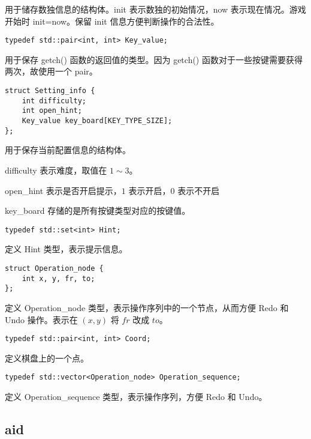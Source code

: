 \documentclass{article}
\begin{document}
    用于储存数独信息的结构体。init 表示数独的初始情况，now 表示现在情况。游戏开始时 init=now。保留 init 信息方便判断操作的合法性。

    \begin{lstlisting}
typedef std::pair<int, int> Key_value;
    \end{lstlisting}

    用于保存 getch() 函数的返回值的类型。因为 getch() 函数对于一些按键需要获得两次，故使用一个 pair。

    \begin{lstlisting}
struct Setting_info {
    int difficulty;
    int open_hint;
    Key_value key_board[KEY_TYPE_SIZE];
};
    \end{lstlisting}

    用于保存当前配置信息的结构体。
    
    difficulty 表示难度，取值在 $1\sim 3$。

    open\_hint 表示是否开启提示，$1$ 表示开启，$0$ 表示不开启

    key\_board 存储的是所有按键类型对应的按键值。

    \begin{lstlisting}
typedef std::set<int> Hint;
    \end{lstlisting}

    定义 Hint 类型，表示提示信息。

    \begin{lstlisting}
struct Operation_node {
    int x, y, fr, to;
};
    \end{lstlisting}

    定义 Operation\_node 类型，表示操作序列中的一个节点，从而方便 Redo 和 Undo 操作。表示在 $(x, y)$ 将 $fr$ 改成 $to$。

    \begin{lstlisting}
typedef std::pair<int, int> Coord;
    \end{lstlisting}

    定义棋盘上的一个点。

    \begin{lstlisting}
typedef std::vector<Operation_node> Operation_sequence;
    \end{lstlisting}

    定义 Operation\_sequence 类型，表示操作序列，方便 Redo 和 Undo。

    \subsection{aid}
    
\end{document}

